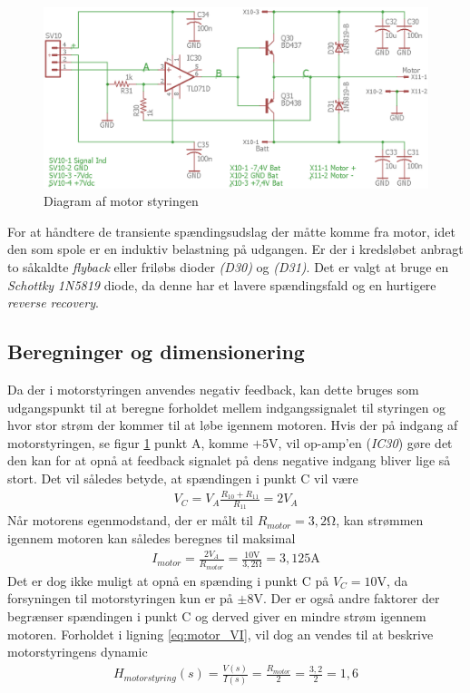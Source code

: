 \begin{figure}[h!]
	\centering
	\includegraphics[width=1\textwidth]{billeder/motor_cont_schematic.png}
	\caption{Diagram af motor styringen}
	\label{fig:motor_diagram}
\end{figure}
\FloatBlock

For at håndtere de transiente spændingsudslag der måtte komme fra motor, idet den som spole er en induktiv belastning på udgangen.
Er der i kredsløbet anbragt to såkaldte \textit{flyback} eller friløbs dioder \emph{(D30)} og \emph{(D31)}.
Det er valgt at bruge en \textit{Schottky} \emph{1N5819}\cite{1N5819} diode, da denne har et lavere spændingsfald og en hurtigere \textit{reverse recovery}.

\subsection{Beregninger og dimensionering}
Da der i motorstyringen anvendes negativ feedback, kan dette bruges som udgangspunkt til at beregne forholdet mellem indgangssignalet til styringen og hvor stor strøm der kommer til at løbe igennem motoren.
Hvis der på indgang af motorstyringen, se figur \ref{fig:motor_diagram} punkt A, komme $+5 \si{\volt}$, vil op-amp'en (\emph{IC30}) gøre det den kan for at opnå at feedback signalet på dens negative indgang bliver lige så stort.
Det vil således betyde, at spændingen i punkt C vil være
\begin{align}
V_C = V_A \frac{R_{10}+R_{11}}{R_{11}} = 2V_A
\end{align}
Når motorens egenmodstand, der er målt til $R_{motor} = 3,2 \si{\ohm}$, kan strømmen igennem motoren kan således beregnes til maksimal
\begin{align}
I_{motor} =  \frac{2V_A}{R_{motor}} = \frac{10\si{\volt}}{3,2\si{\ohm}} = 3,125\si{\ampere} \label{eq:motor_VI}
\end{align}
Det er dog ikke muligt at opnå en spænding i punkt C på $V_C = 10\si{\volt}$, da forsyningen til motorstyringen kun er på $\pm 8 \si{\volt}$.
Der er også andre faktorer der begrænser spændingen i punkt C og derved giver en mindre strøm igennem motoren.
Forholdet i ligning \ref{eq:motor_VI}, vil dog an vendes til at beskrive motorstyringens dynamic
\begin{align}
H_{motor styring}(s) = \frac{V(s)}{I(s)} =\frac{R_{motor}}{2} = \frac{3,2}{2} = 1,6 \label{eq:motor_styr_trans}
\end{align}   

